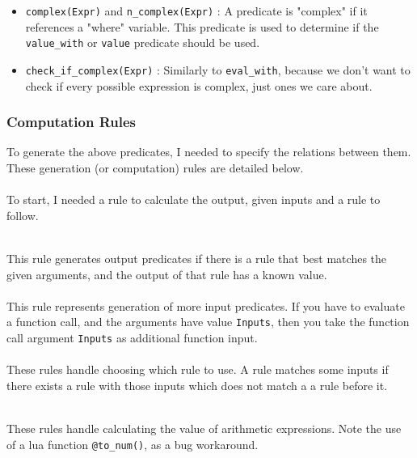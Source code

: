 \begin{itemize}
\item \lstinline{complex(Expr)} and \lstinline{n_complex(Expr)} : A predicate is "complex" if it references a "where" variable. This predicate is used to determine if the \lstinline{value_with} or \lstinline{value} predicate should be used.
\item \lstinline{check_if_complex(Expr)} : Similarly to \lstinline{eval_with}, because we don't want to check if every possible expression is complex, just ones we care about.
\end{itemize}


\subsubsection{Computation Rules}
To generate the above predicates, I needed to specify the relations between them. These generation (or computation) rules are detailed below. \\ \\
To start, I needed a rule to calculate the output, given inputs and a rule to follow.

 
\mbox{} \\
This rule generates output predicates if there is a rule that best matches the given arguments, and the output of that rule has a known value. \\


\mbox{} \\
This rule represents generation of more input predicates. If you have to evaluate a function call, and the arguments have value \lstinline{Inputs}, then you take the function call argument \lstinline{Inputs} as additional function input. \\


\mbox{} \\
These rules handle choosing which rule to use. A rule matches some inputs if there exists a rule with those inputs which does not match a a rule before it.


\mbox{} \\
These rules handle calculating the value of arithmetic expressions. Note the use of a lua function \lstinline{@to_num()}, as a bug workaround. %

